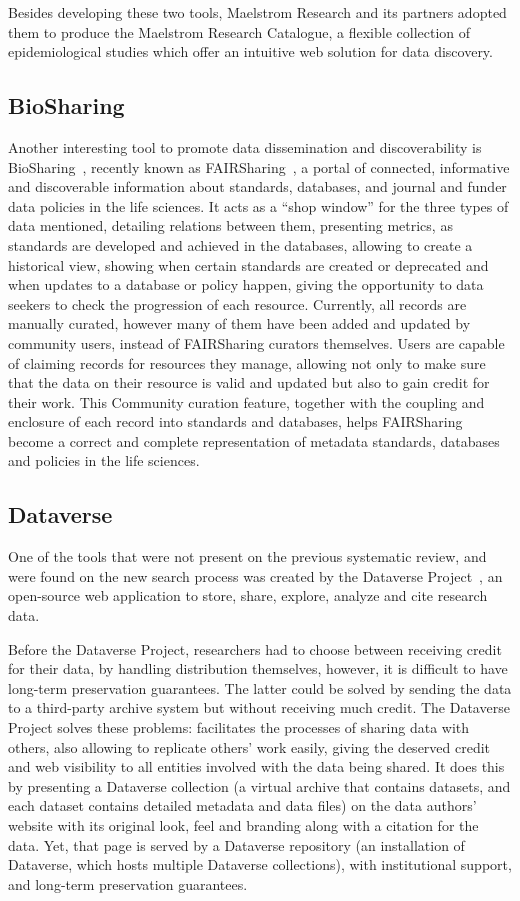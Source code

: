 Besides developing these two tools, Maelstrom Research and its partners adopted them to produce the Maelstrom Research Catalogue, a flexible collection of epidemiological studies which offer an intuitive web solution for data discovery.

\subsection*{BioSharing}
Another interesting tool to promote data dissemination and discoverability is BioSharing~\cite{biosharing}, recently known as FAIRSharing~\cite{fairsharing}, a portal of connected, informative and discoverable information about standards, databases, and journal and funder data policies in the life sciences.
It acts as a ``shop window'' for the three types of data mentioned, detailing relations between them, presenting metrics, as standards are developed and achieved in the databases, allowing to create a historical view, showing when certain standards are created or deprecated and when updates to a database or policy happen, giving the opportunity to data seekers to check the progression of each resource.
Currently, all records are manually curated, however many of them have been added and updated by community users, instead of FAIRSharing curators themselves.
Users are capable of claiming records for resources they manage, allowing not only to make sure that the data on their resource is valid and updated but also to gain credit for their work.
This Community curation feature, together with the coupling and enclosure of each record into standards and databases, helps FAIRSharing become a correct and complete representation of metadata standards, databases and policies in the life sciences.

\subsection*{Dataverse}
One of the tools that were not present on the previous systematic review, and were found on the new search process was created by the Dataverse Project~\cite{dataverse}, an open-source web application to store, share, explore, analyze and cite research data.

Before the Dataverse Project, researchers had to choose between receiving credit for their data, by handling distribution themselves, however, it is difficult to have long-term preservation guarantees.
The latter could be solved by sending the data to a third-party archive system but without receiving much credit.
The Dataverse Project solves these problems: facilitates the processes of sharing data with others, also allowing to replicate others' work easily, giving the deserved credit and web visibility to all entities involved with the data being shared.
It does this by presenting a Dataverse collection (a virtual archive that contains datasets, and each dataset contains detailed metadata and data files) on the data authors' website with its original look, feel and branding along with a citation for the data.
Yet, that page is served by a Dataverse repository (an installation of Dataverse, which hosts multiple Dataverse collections), with institutional support, and long-term preservation guarantees.

